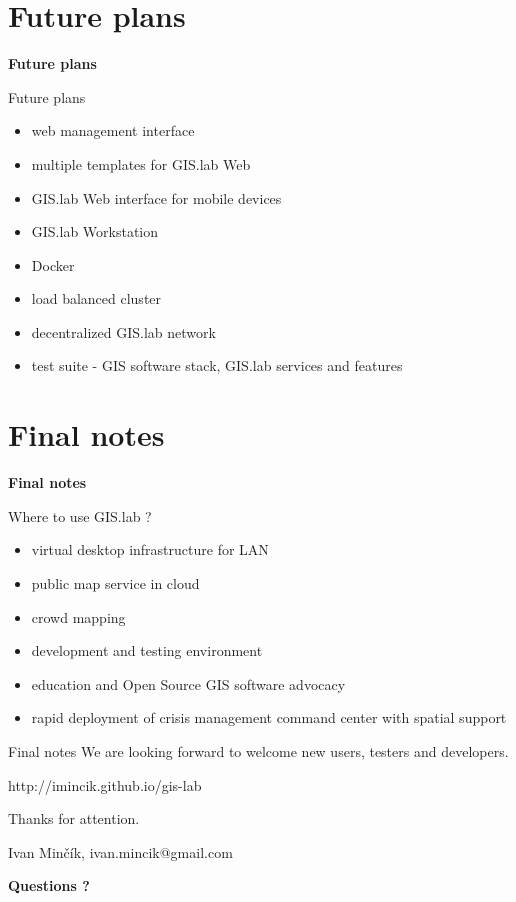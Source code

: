\documentclass[12pt]{beamer}
\begin{document}
\section{Future plans}
\begin{frame}
	\begin{center}
		\LARGE\textbf{Future plans}
	\end{center}
\end{frame}


\begin{frame}{Future plans}
	\begin{itemize}
		\item web management interface
		\item multiple templates for GIS.lab Web
		\item GIS.lab Web interface for mobile devices
		\item GIS.lab Workstation
		\item Docker
		\item load balanced cluster
		\item decentralized GIS.lab network
		\item test suite - GIS software stack, GIS.lab services and features
	\end{itemize}
\end{frame}


\section{Final notes}
\begin{frame}
	\begin{center}
		\LARGE\textbf{Final notes}
	\end{center}
\end{frame}


\begin{frame}{Where to use GIS.lab ?}
	\begin{itemize}
		\item virtual desktop infrastructure for LAN
		\item public map service in cloud
		\item crowd mapping
		\item development and testing environment
		\item education and Open Source GIS software advocacy
		\item rapid deployment of crisis management command center with spatial support
	\end{itemize}
\end{frame}


\begin{frame}{Final notes}
	We are looking forward to welcome new users, testers and developers.
	
	\bigskip
	http://imincik.github.io/gis-lab
	
	\bigskip
	Thanks for attention.
	
	Ivan Minčík, ivan.mincik@gmail.com

	\bigskip 
	\LARGE\textbf{Questions ?}
\end{frame}


\end{document}
